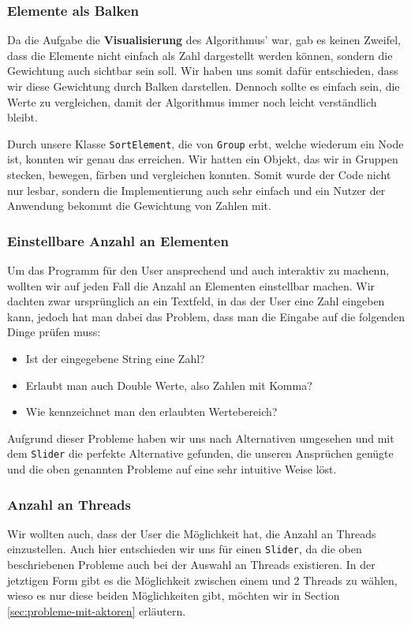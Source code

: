 \subsubsection{Elemente als Balken}
Da die Aufgabe die \textbf{Visualisierung} des Algorithmus' war, gab es keinen Zweifel, dass die Elemente nicht einfach als Zahl dargestellt werden können, sondern die Gewichtung auch sichtbar sein soll. Wir haben uns somit dafür entschieden, dass wir diese Gewichtung durch Balken darstellen. Dennoch sollte es einfach sein, die Werte zu vergleichen, damit der Algorithmus immer noch leicht verständlich bleibt.

Durch unsere Klasse \texttt{SortElement}, die von \texttt{Group} erbt, welche wiederum ein Node ist, konnten wir genau das erreichen. Wir hatten ein Objekt, das wir in Gruppen stecken, bewegen, färben und vergleichen konnten. Somit wurde der Code nicht nur lesbar, sondern die Implementierung auch sehr einfach und ein Nutzer der Anwendung bekommt die Gewichtung von Zahlen mit.

\subsubsection{Einstellbare Anzahl an Elementen}
Um das Programm für den User ansprechend und auch interaktiv zu machenn, wollten wir auf jeden Fall die Anzahl an Elementen einstellbar machen. Wir dachten zwar ursprünglich an ein Textfeld, in das der User eine Zahl eingeben kann, jedoch hat man dabei das Problem, dass man die Eingabe auf die folgenden Dinge prüfen muss:

\begin{itemize}
\item Ist der eingegebene String eine Zahl?
\item Erlaubt man auch Double Werte, also Zahlen mit Komma?
\item Wie kennzeichnet man den erlaubten Wertebereich?
\end{itemize}

Aufgrund dieser Probleme haben wir uns nach Alternativen umgesehen und mit dem \texttt{Slider} die perfekte Alternative gefunden, die unseren Ansprüchen genügte und die oben genannten Probleme auf eine sehr intuitive Weise löst.

\subsubsection{Anzahl an Threads}
Wir wollten auch, dass der User die Möglichkeit hat, die Anzahl an Threads einzustellen. Auch hier entschieden wir uns für einen \texttt{Slider}, da die oben beschriebenen Probleme auch bei der Auswahl an Threads existieren. In der jetztigen Form gibt es die Möglichkeit zwischen einem und 2 Threads zu wählen, wieso es nur diese beiden Möglichkeiten gibt, möchten wir in Section \ref{sec:probleme-mit-aktoren} erläutern.

